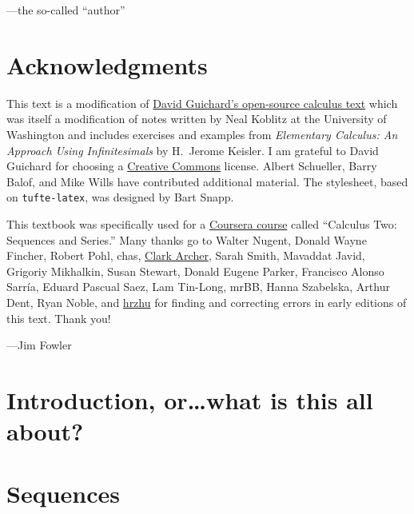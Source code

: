 \documentclass[justified]{tufte-book}
\begin{document}
\vspace{0.5in}
\hfill---the so-called ``author''

\chapter*{Acknowledgments}

This text is a modification of
\href{http://www.whitman.edu/mathematics/calculus/}{David Guichard's
  open-source calculus text} which was itself a modification of notes
written by Neal Koblitz at the University of Washington and includes
exercises and examples from {\it Elementary Calculus: An Approach
  Using Infinitesimals} by H.~Jerome Keisler.  I am grateful to David
Guichard for choosing a
\href{http://creativecommons.org/licenses/by-nc-sa/3.0/}{Creative
  Commons} license.  Albert Schueller, Barry Balof, and Mike Wills
have contributed additional material.  The stylesheet, based on \texttt{tufte-latex}, was designed by Bart Snapp.

This textbook was specifically used for a
\href{https://www.coursera.org/course/sequence}{Coursera course}
called ``Calculus Two: Sequences and Series.''  Many thanks go to
Walter Nugent, Donald Wayne Fincher, Robert Pohl, chas,
\href{https://github.com/clark-archer}{Clark Archer}, Sarah Smith,
Mavaddat Javid, Grigoriy Mikhalkin, Susan Stewart, Donald Eugene Parker, Francisco Alonso Sarr\'ia, Eduard Pascual Saez, Lam Tin-Long, mrBB, Hanna
Szabelska, Arthur Dent, Ryan Noble, and
\href{https://github.com/hrzhu}{hrzhu} for finding and correcting
errors in early editions of this text.  Thank you!

\vspace{0.5in}
\hfill---Jim Fowler

\mainmatter

\chapter*{Introduction, or\ldots what is this all about?}



\chapter{Sequences}
\label{chapter:sequences}

\end{document}
